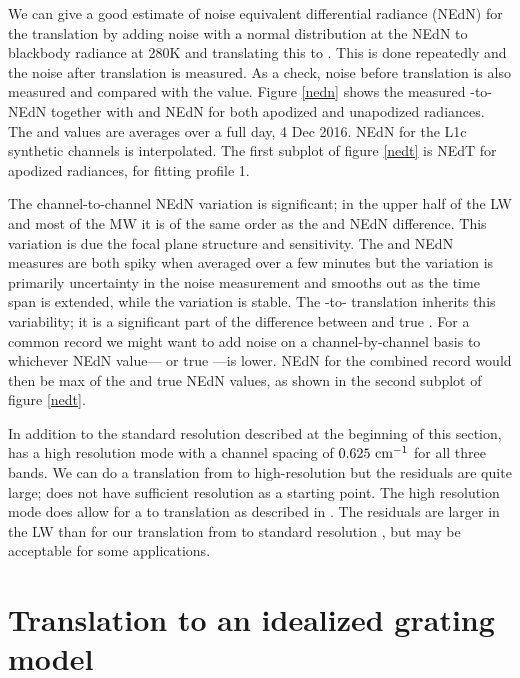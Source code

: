 \documentclass[10pt,twocolumn]{article}
\begin{document}
We can give a good estimate of noise equivalent differential
radiance (NEdN) for the translation by adding noise with a normal
distribution at the {\airs} NEdN to blackbody radiance at 280K and
translating this to {\cris}.  This is done repeatedly and the noise
after translation is measured.  As a check, noise before translation
is also measured and compared with the {\airs} value.  Figure
\ref{nedn} shows the measured {\airs}-to-{\cris} NEdN together with
{\airs} and {\cris} NEdN for both apodized and unapodized radiances.
The {\airs} and {\cris} values are averages over a full day, 4 Dec
2016.  NEdN for the L1c synthetic channels is interpolated.  The
first subplot of figure \ref{nedt} is NEdT for apodized radiances,
for fitting profile 1.

The {\airs} channel-to-channel NEdN variation is significant; in the
upper half of the LW and most of the MW it is of the same order as
the {\airs} and {\cris} NEdN difference.  This variation is due the
{\airs} focal plane structure and sensitivity.  The {\airs} and
{\cris} NEdN measures are both spiky when averaged over a few
minutes but the {\cris} variation is primarily uncertainty in the
noise measurement and smooths out as the time span is extended,
while the {\airs} variation is stable.  The {\airs}-to-{\cris}
translation inherits this variability; it is a significant part of
the difference between {\airs} {\cris} and true {\cris}.  For a
common record we might want to add noise on a channel-by-channel
basis to whichever NEdN value---{\airs} {\cris} or true {\cris}---is
lower.  NEdN for the combined record would then be max of the
{\airs} {\cris} and true {\cris} NEdN values, as shown in the second
subplot of figure \ref{nedt}.

In addition to the standard resolution described at the beginning 
of this section, {\cris} has a high resolution mode with a channel
spacing of $0.625~\mbox{cm$^{-1}$}$ for all three bands.  We can do a translation
from {\airs} to high-resolution {\cris} but the residuals are quite
large; {\airs} does not have sufficient resolution as a starting
point.  The high resolution mode does allow for a {\cris} to {\airs}
translation as described in \cite{git:decon}.  The residuals are
larger in the LW than for our translation from {\airs} to standard
resolution {\cris}, but may be acceptable for some applications.

\section{Translation to an idealized grating model}
\label{airsL1d}
\end{document}
